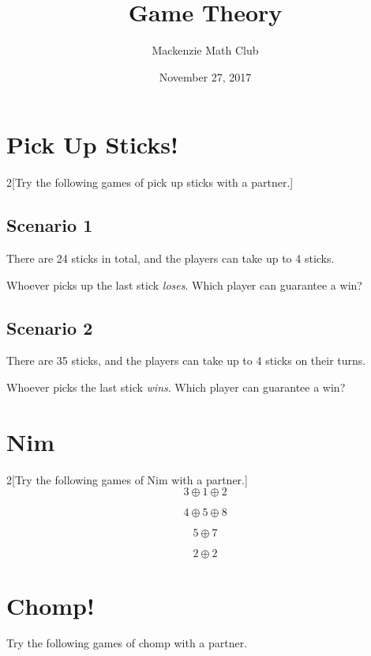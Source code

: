 

\usepackage{multicol}
\usepackage{tikz}

\newcommand{\emoji}[1]{\raisebox{-0.25\baselineskip}{\texttt{[image: \#1]}}}

\title{Game Theory}
\author{Mackenzie Math Club}
\date{November 27, 2017}


\setlength{\columnsep}{1cm}
\setlength{\columnseprule}{1pt}


	\section{Pick Up Sticks!}
	\begin{multicols}{2}[Try the following games of pick up sticks with a partner.]
		\subsection{Scenario 1}
			There are 24 sticks in total, and the players can take up to 4 sticks.

			Whoever picks up the last stick \emph{loses}. Which player can guarantee a win?
			\solutionspace{1.5in}
		\columnbreak
		\subsection{Scenario 2}
			There are 35 sticks, and the players can take up to 4 sticks on their turns.

			Whoever picks the last stick \emph{wins}. Which player can guarantee a win?
			\solutionspace{1.5in}
	\end{multicols}
	\section{Nim}
	\begin{multicols}{2}[Try the following games of Nim with a partner.]
		\[3 \oplus 1 \oplus 2\]
		\solutionspace{1in}

		\[4 \oplus 5 \oplus 8\]
		\solutionspace{1in}

		\[5 \oplus 7\]
		\solutionspace{1in}

		\[2 \oplus 2\]
		\solutionspace{1in}
	\end{multicols}
	\section{Chomp!}
		Try the following games of chomp with a partner.

